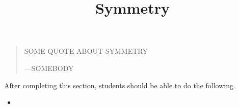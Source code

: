\documentclass{ximera}
\title{Symmetry}
\begin{document}
\begin{abstract}
\end{abstract}
\maketitle

\begin{quote}
  SOME QUOTE ABOUT SYMMETRY


  \hfill ---SOMEBODY
\end{quote}
After completing this section, students should be able to do the following.

\begin{itemize}
\item 
\end{itemize}
\end{document}

